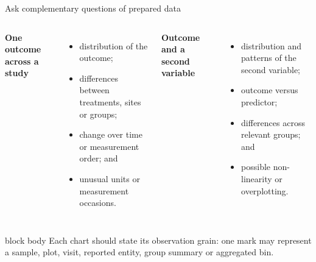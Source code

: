 \documentclass[10pt,aspectratio=169]{beamer}
\begin{document}
\begin{frame}{Ask complementary questions of prepared data}

\small

\begin{columns}[T]


\textbf{One outcome across a study}

\begin{itemize}
  \item distribution of the outcome;
  \item differences between treatments, sites or groups;
  \item change over time or measurement order; and
  \item unusual units or measurement occasions.
\end{itemize}


\textbf{Outcome and a second variable}

\begin{itemize}
  \item distribution and patterns of the second variable;
  \item outcome versus predictor;
  \item differences across relevant groups; and
  \item possible non-linearity or overplotting.
\end{itemize}

\end{columns}

\vspace{0.35cm}

\begin{beamercolorbox}[rounded=true,sep=8pt]{block body}
Each chart should state its observation grain: one mark may represent a sample, plot, visit, reported entity, group summary or aggregated bin.
\end{beamercolorbox}

\end{frame}
\end{document}

